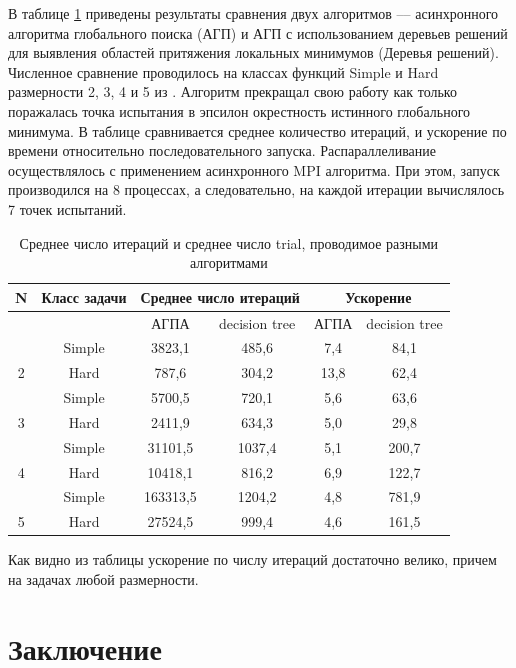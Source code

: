 \documentclass{svproc}
\begin{document}
В таблице \ref{tab:2} приведены результаты сравнения двух алгоритмов –-- асинхронного алгоритма глобального поиска (АГП) и АГП с использованием деревьев решений для выявления областей притяжения локальных минимумов (Деревья решений). Численное сравнение проводилось на классах функций Simple и Hard размерности 2, 3, 4 и 5 из \cite{fio_bib19}. Алгоритм прекращал свою работу как только поражалась точка испытания в эпсилон окрестность истинного глобального минимума. В таблице сравнивается среднее количество итераций, и ускорение по времени относительно последовательного запуска. Распараллеливание  осуществлялось с применением асинхронного MPI алгоритма. При этом, запуск производился на 8 процессах, а следовательно, на каждой итерации вычислялось 7 точек испытаний.


\begin{table}[h!]
	\caption{Среднее число итераций и среднее число trial, проводимое разными алгоритмами}
	\label{tab:2}
	\centering
	\begin{tabular}{|c|c|c|c|c|c|}
		\hline
		
		N & Класс задачи & \multicolumn{2}{c|}{Среднее число итераций} & \multicolumn{2}{c|}{Ускорение} \\ \hline
		& ~ & АГПА & decision tree & АГПА & decision tree \\ \hline
		& Simple & 3823,1   & 485,6  & 7,4   & 84,1 \\ \hline
		2  & Hard & 787,6    & 304,2  & 13,8  & 62,4  \\ \hline
		& Simple & 5700,5   & 720,1  & 5,6   & 63,6  \\ \hline
		3  & Hard & 2411,9   & 634,3  & 5,0   & 29,8  \\ \hline
		& Simple & 31101,5  & 1037,4 & 5,1   & 200,7  \\ \hline
		4  & Hard & 10418,1  & 816,2  & 6,9   & 122,7  \\ \hline
		& Simple & 163313,5 & 1204,2 & 4,8   & 781,9  \\ \hline
		5  & Hard & 27524,5  & 999,4  & 4,6   & 161,5  \\ \hline
	\end{tabular}
\end{table}

Как видно из таблицы ускорение по числу итераций достаточно велико, причем на задачах любой размерности. 

\section{Заключение}\label{SecC}
\end{document}

